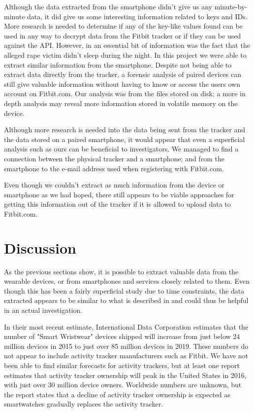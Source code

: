 \documentclass[a4paper,11pt,dvips]{article}
\begin{document}
Although the data extracted from the smartphone didn’t give us any minute-by-minute data, it did give us some interesting information related to keys and IDs. More research is needed to determine if any of the key-like values found can be used in any way to decrypt data from the Fitbit tracker or if they can be used against the API. However, in \cite{Snyder:2015} an essential bit of information was the fact that the alleged rape victim didn’t sleep during the night. In this project we were able to extract similar information from the smartphone. Despite not being able to extract data directly from the tracker, a forensic analysis of paired devices can still give valuable information without having to know or access the users own account on Fitbit.com. Our analysis was from the files stored on disk; a more in depth analysis may reveal more information stored in volatile memory on the device.

Although more research is needed into the data being sent from the tracker and the data stored on a paired smartphone, it would appear that even a superficial analysis such as ours can be beneficial to investigators. We managed to find a connection between the physical tracker and a smartphone; and from the smartphone to the e-mail address used when registering with Fitbit.com.

Even though we couldn’t extract as much information from the device or smartphone as we had hoped, there still appears to be viable approaches for getting this information out of the tracker if it is allowed to upload data to Fitbit.com.


\section{Discussion}

As the previous sections show, it is possible to extract valuable data from the wearable devices, or from smartphones and services closely related to them. Even though this has been a fairly superficial study due to time constraints, the data extracted appears to be similar to what is described in \cite{Snyder:2015} and could thus be helpful in an actual investigation. 

In their most recent estimate, International Data Corporation estimates that the number of "Smart Wristwear" devices shipped will increase from just below 24 million devices in 2015 to just over 85 million devices in 2019. These numbers do not appear to include activity tracker manufacturers such as Fitbit. \cite{idc2015} We have not been able to find similar forecasts for activity trackers, but at least one report estimates that activity tracker ownership will peak in the United States in 2016, with just over 30 million device owners. Worldwide numbers are unknown, but the report states that a decline of activity tracker ownership is expected as smartwatches gradually replaces the activity tracker. \cite{npd2015}
\end{document}
